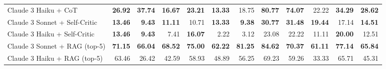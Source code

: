 \begin{table}[H]
{\begin{tabular}{lrrrrrrrrrrr}
\rowcolor{Gray}
Claude 3 Haiku + CoT & \textbf{26.92} & \textbf{37.74} & \textbf{16.67} & \textbf{23.21} & \textbf{13.33} & 18.75 & \textbf{80.77} & \textbf{74.07} & 22.22 & \textbf{34.29} & \textbf{28.62} \\
Claude 3 Sonnet + Self-Critic & \textbf{13.46} & \textbf{9.43} & \textbf{11.11} & 10.71 & \textbf{13.33} & \textbf{9.38} & \textbf{30.77} & \textbf{31.48} & \textbf{19.44} & 17.14 & \textbf{14.51} \\
Claude 3 Haiku + Self-Critic & \textbf{13.46} & \textbf{9.43} & 7.41 & \textbf{16.07} & 2.22 & 3.12 & 23.08 & 22.22 & 11.11 & \textbf{20.00} & 12.51 \\
\rowcolor{Gray}
Claude 3 Sonnet + RAG (top-5) & \textbf{71.15} & \textbf{66.04} & \textbf{68.52} & \textbf{75.00} & \textbf{62.22} & \textbf{81.25} & \textbf{84.62} & \textbf{70.37} & \textbf{61.11} & \textbf{77.14} & \textbf{65.84} \\
\rowcolor{Gray}
Claude 3 Haiku + RAG (top-5) & 63.46 & 26.42 & 42.59 & 58.93 & 48.89 & 56.25 & 69.23 & 59.26 & 33.33 & 65.71 & 45.31 \\
\bottomrule
\end{tabular}
}
 \label{tab:implicit_persona_20topics_300}
\end{table}


